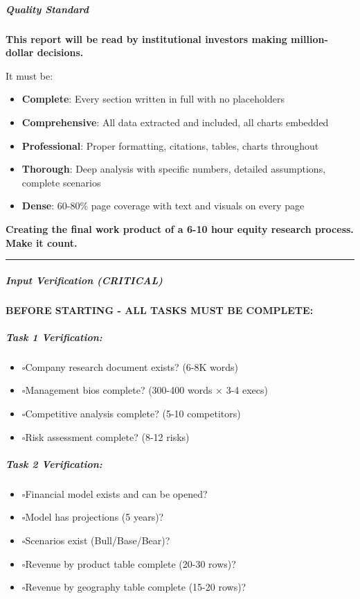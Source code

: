 \documentclass[11pt]{article}
\newcommand{\UncheckedBox}{$\square$}
\begin{document}
\subparagraph{Quality Standard}\mbox{}\par

\textbf{This report will be read by institutional investors making million-dollar decisions.}


It must be:

\begin{itemize}[leftmargin=*,itemsep=2pt,topsep=2pt]
\item {} \textbf{Complete}: Every section written in full with no placeholders
\item {} \textbf{Comprehensive}: All data extracted and included, all charts embedded
\item {} \textbf{Professional}: Proper formatting, citations, tables, charts throughout
\item {} \textbf{Thorough}: Deep analysis with specific numbers, detailed assumptions, complete scenarios
\item {} \textbf{Dense}: 60-80\% page coverage with text and visuals on every page
\end{itemize}

\textbf{Creating the final work product of a 6-10 hour equity research process. Make it count.}


\vspace{0.5em}\hrule\vspace{0.5em}

\subparagraph{Input Verification (CRITICAL)}\mbox{}\par

\textbf{BEFORE STARTING - ALL TASKS MUST BE COMPLETE:}


\subparagraph{Task 1 Verification:}\mbox{}\par
\begin{itemize}[leftmargin=*,itemsep=2pt,topsep=2pt]
\item {} \UncheckedBox Company research document exists? (6-8K words)
\item {} \UncheckedBox Management bios complete? (300-400 words × 3-4 execs)
\item {} \UncheckedBox Competitive analysis complete? (5-10 competitors)
\item {} \UncheckedBox Risk assessment complete? (8-12 risks)
\end{itemize}

\subparagraph{Task 2 Verification:}\mbox{}\par
\begin{itemize}[leftmargin=*,itemsep=2pt,topsep=2pt]
\item {} \UncheckedBox Financial model exists and can be opened?
\item {} \UncheckedBox Model has projections (5 years)?
\item {} \UncheckedBox Scenarios exist (Bull/Base/Bear)?
\item {} \UncheckedBox Revenue by product table complete (20-30 rows)?
\item {} \UncheckedBox Revenue by geography table complete (15-20 rows)?
\end{itemize}
\end{document}
